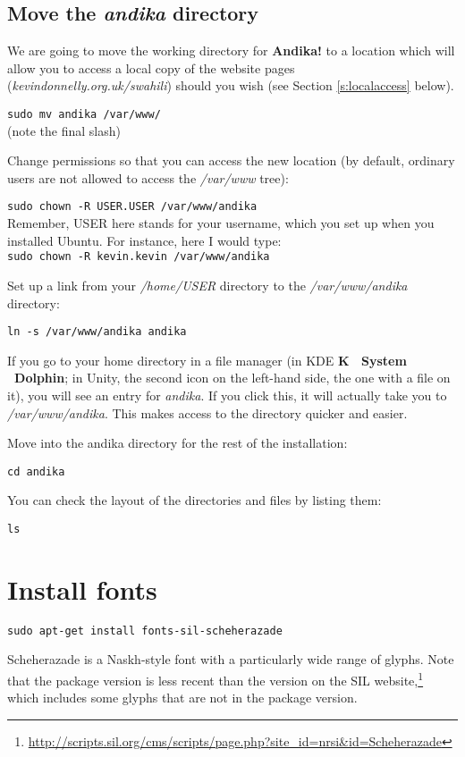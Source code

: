 \documentclass[a4paper,10pt]{article}
\begin{document}
\subsection{Move the \textit{andika} directory}

We are going to move the working directory for \textbf{Andika!} to a location which will allow you to access a local copy of the website pages (\textit{kevindonnelly.org.uk/swahili}) should you wish (see Section \ref{s:localaccess} below).

\verb|sudo mv andika /var/www/|\\
(note the final slash)

Change permissions so that you can access the new location (by default, ordinary users are not allowed to access the \textit{/var/www} tree):

\verb|sudo chown -R USER.USER /var/www/andika|\\
Remember, USER here stands for your username, which you set up when you installed Ubuntu.  For instance, here I would type:\\
\verb|sudo chown -R kevin.kevin /var/www/andika|

Set up a link from your \textit{/home/USER} directory to the \textit{/var/www/andika} directory:

\verb|ln -s /var/www/andika andika|

If you go to your home directory in a file manager (in KDE \textbf{K \textrightarrow\ System \textrightarrow\ Dolphin}; in Unity, the second icon on the left-hand side, the one with a file on it), you will see an entry for \textit{andika}.  If you click this, it will actually take you to \textit{/var/www/andika}.  This makes access to the directory quicker and easier.

Move into the andika directory for the rest of the installation:

\verb|cd andika|

You can check the layout of the directories and files by listing them:

\verb|ls|


\section{Install fonts}
\label{s:fonts}

\verb|sudo apt-get install fonts-sil-scheherazade|

Scheherazade is a Naskh-style font with a particularly wide range of glyphs.  Note that the package version is less recent than the version on the SIL website,\footnote{\url{http://scripts.sil.org/cms/scripts/page.php?site_id=nrsi&id=Scheherazade}} which includes some glyphs that are not in the package version.
\end{document}
